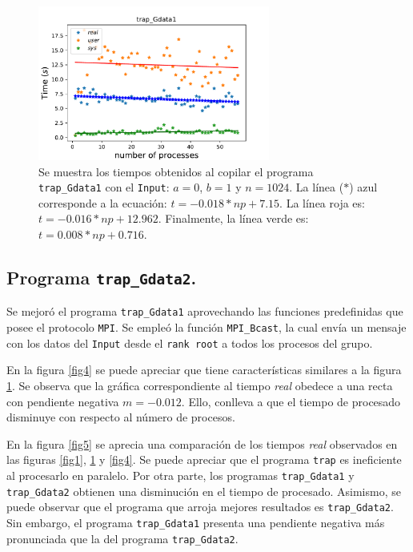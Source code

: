 \documentclass[twocolumn]{article}
\begin{document}
\begin{figure}
    \centering
    \includegraphics[width=3in]{fig_3.pdf}
    \caption{Se muestra los tiempos obtenidos al copilar el programa \texttt{trap\_Gdata1} con el \texttt{Input}: $a=0$, $b=1$ y $n=1024$. La línea ($*$) azul corresponde a la ecuación: $t =-0.018*np + 7.15$. La línea roja es: $t = -0.016*np + 12.962$. Finalmente, la línea verde es: $t = 0.008*np + 0.716$. } \label{fig3}
\end{figure}

\subsection{Programa \texttt{trap\_Gdata2}.}

Se mejoró el programa \texttt{trap\_Gdata1} aprovechando las funciones predefinidas que posee el protocolo \texttt{MPI}. Se empleó la función \texttt{MPI\_Bcast}, la cual envía un mensaje con los datos del \texttt{Input} desde el \texttt{rank root} a todos los procesos del grupo.

En la figura \ref{fig4} se puede apreciar que tiene características similares a la figura \ref{fig3}. Se observa que la gráfica correspondiente al tiempo \textit{real} obedece a una  recta con pendiente negativa $m=-0.012$. Ello, conlleva a que el tiempo de procesado disminuye con respecto al número de procesos.

En la figura \ref{fig5} se aprecia una comparación de los tiempos \textit{real} observados en las figuras \ref{fig1}, \ref{fig3} y \ref{fig4}. Se puede apreciar que el programa \texttt{trap} es ineficiente al procesarlo en paralelo. Por otra parte, los programas \texttt{trap\_Gdata1} y \texttt{trap\_Gdata2} obtienen una disminución en el tiempo de procesado. Asimismo, se puede observar que el programa que arroja mejores resultados es \texttt{trap\_Gdata2}. Sin embargo, el programa \texttt{trap\_Gdata1} presenta una pendiente negativa más pronunciada que la del programa \texttt{trap\_Gdata2}. 
\end{document}
